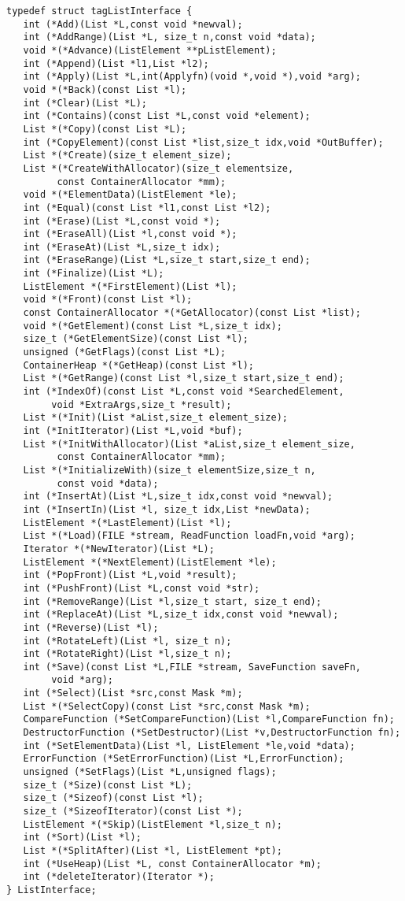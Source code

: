 \begin{verbatim}
typedef struct tagListInterface {
   int (*Add)(List *L,const void *newval);
   int (*AddRange)(List *L, size_t n,const void *data);
   void *(*Advance)(ListElement **pListElement);
   int (*Append)(List *l1,List *l2);
   int (*Apply)(List *L,int(Applyfn)(void *,void *),void *arg);
   void *(*Back)(const List *l);
   int (*Clear)(List *L);
   int (*Contains)(const List *L,const void *element);
   List *(*Copy)(const List *L);
   int (*CopyElement)(const List *list,size_t idx,void *OutBuffer);
   List *(*Create)(size_t element_size);
   List *(*CreateWithAllocator)(size_t elementsize,
         const ContainerAllocator *mm);
   void *(*ElementData)(ListElement *le);
   int (*Equal)(const List *l1,const List *l2);
   int (*Erase)(List *L,const void *);
   int (*EraseAll)(List *l,const void *);
   int (*EraseAt)(List *L,size_t idx);
   int (*EraseRange)(List *L,size_t start,size_t end);
   int (*Finalize)(List *L);
   ListElement *(*FirstElement)(List *l);
   void *(*Front)(const List *l);
   const ContainerAllocator *(*GetAllocator)(const List *list);
   void *(*GetElement)(const List *L,size_t idx);
   size_t (*GetElementSize)(const List *l);
   unsigned (*GetFlags)(const List *L);
   ContainerHeap *(*GetHeap)(const List *l);
   List *(*GetRange)(const List *l,size_t start,size_t end);
   int (*IndexOf)(const List *L,const void *SearchedElement,
        void *ExtraArgs,size_t *result);
   List *(*Init)(List *aList,size_t element_size);
   int (*InitIterator)(List *L,void *buf);
   List *(*InitWithAllocator)(List *aList,size_t element_size,
         const ContainerAllocator *mm);
   List *(*InitializeWith)(size_t elementSize,size_t n,
         const void *data);
   int (*InsertAt)(List *L,size_t idx,const void *newval);
   int (*InsertIn)(List *l, size_t idx,List *newData);
   ListElement *(*LastElement)(List *l);
   List *(*Load)(FILE *stream, ReadFunction loadFn,void *arg);
   Iterator *(*NewIterator)(List *L);
   ListElement *(*NextElement)(ListElement *le);
   int (*PopFront)(List *L,void *result);
   int (*PushFront)(List *L,const void *str);
   int (*RemoveRange)(List *l,size_t start, size_t end);
   int (*ReplaceAt)(List *L,size_t idx,const void *newval);
   int (*Reverse)(List *l);
   int (*RotateLeft)(List *l, size_t n);
   int (*RotateRight)(List *l,size_t n);
   int (*Save)(const List *L,FILE *stream, SaveFunction saveFn,
        void *arg);
   int (*Select)(List *src,const Mask *m);
   List *(*SelectCopy)(const List *src,const Mask *m);
   CompareFunction (*SetCompareFunction)(List *l,CompareFunction fn);
   DestructorFunction (*SetDestructor)(List *v,DestructorFunction fn);
   int (*SetElementData)(List *l, ListElement *le,void *data);
   ErrorFunction (*SetErrorFunction)(List *L,ErrorFunction);
   unsigned (*SetFlags)(List *L,unsigned flags);
   size_t (*Size)(const List *L);
   size_t (*Sizeof)(const List *l);
   size_t (*SizeofIterator)(const List *);
   ListElement *(*Skip)(ListElement *l,size_t n);
   int (*Sort)(List *l);
   List *(*SplitAfter)(List *l, ListElement *pt);
   int (*UseHeap)(List *L, const ContainerAllocator *m);
   int (*deleteIterator)(Iterator *);
} ListInterface;
\end{verbatim}
